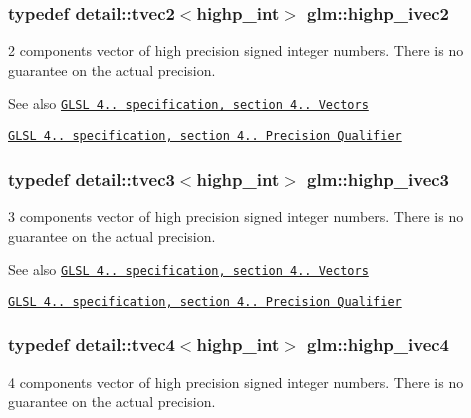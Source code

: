 \subsubsection[{highp\+\_\+ivec2}]{\setlength{\rightskip}{0pt plus 5cm}typedef detail\+::tvec2$<$highp\+\_\+int$>$ {\bf glm\+::highp\+\_\+ivec2}}\label{group__core__precision_ga83738eb062e2e6b5e52cd0461da9c742}
2 components vector of high precision signed integer numbers. There is no guarantee on the actual precision.

\begin{DoxySeeAlso}{See also}
\href{http://www.opengl.org/registry/doc/GLSLangSpec.4.20.8.pdf}{\tt G\+L\+S\+L 4.. specification, section 4.. Vectors} 

\href{http://www.opengl.org/registry/doc/GLSLangSpec.4.20.8.pdf}{\tt G\+L\+S\+L 4.. specification, section 4.. Precision Qualifier} 
\end{DoxySeeAlso}
\hypertarget{group__core__precision_ga8d03a7d21f89a6541a278bf78bb6b1fa}{}
\subsubsection[{highp\+\_\+ivec3}]{\setlength{\rightskip}{0pt plus 5cm}typedef detail\+::tvec3$<$highp\+\_\+int$>$ {\bf glm\+::highp\+\_\+ivec3}}\label{group__core__precision_ga8d03a7d21f89a6541a278bf78bb6b1fa}
3 components vector of high precision signed integer numbers. There is no guarantee on the actual precision.

\begin{DoxySeeAlso}{See also}
\href{http://www.opengl.org/registry/doc/GLSLangSpec.4.20.8.pdf}{\tt G\+L\+S\+L 4.. specification, section 4.. Vectors} 

\href{http://www.opengl.org/registry/doc/GLSLangSpec.4.20.8.pdf}{\tt G\+L\+S\+L 4.. specification, section 4.. Precision Qualifier} 
\end{DoxySeeAlso}
\hypertarget{group__core__precision_ga69b5a957eb1f6a1201cd7eb9a6ac04c5}{}
\subsubsection[{highp\+\_\+ivec4}]{\setlength{\rightskip}{0pt plus 5cm}typedef detail\+::tvec4$<$highp\+\_\+int$>$ {\bf glm\+::highp\+\_\+ivec4}}\label{group__core__precision_ga69b5a957eb1f6a1201cd7eb9a6ac04c5}
4 components vector of high precision signed integer numbers. There is no guarantee on the actual precision.

